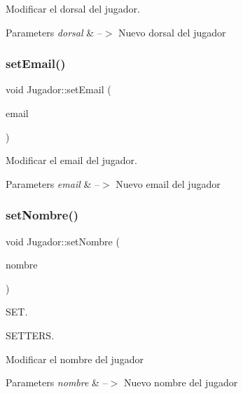 Modificar el dorsal del jugador. 


\begin{DoxyParams}{Parameters}
{\em dorsal} & --$>$ Nuevo dorsal del jugador \\
\hline
\end{DoxyParams}
\mbox{\label{classJugador_abe37872318ab13c0b6043302eb31082c}} 
\subsubsection{\texorpdfstring{set\+Email()}{setEmail()}}
{\footnotesize\ttfamily void Jugador\+::set\+Email (\begin{DoxyParamCaption}\item[{Q\+String}]{email }\end{DoxyParamCaption})}



Modificar el email del jugador. 


\begin{DoxyParams}{Parameters}
{\em email} & --$>$ Nuevo email del jugador \\
\hline
\end{DoxyParams}
\mbox{\label{classJugador_a66ae18a593fe618962a7c78fa201712a}} 
\subsubsection{\texorpdfstring{set\+Nombre()}{setNombre()}}
{\footnotesize\ttfamily void Jugador\+::set\+Nombre (\begin{DoxyParamCaption}\item[{Q\+String}]{nombre }\end{DoxyParamCaption})}



S\+ET. 

S\+E\+T\+T\+E\+RS.

Modificar el nombre del jugador 
\begin{DoxyParams}{Parameters}
{\em nombre} & --$>$ Nuevo nombre del jugador \\
\hline
\end{DoxyParams}
\mbox{\label{classJugador_a0b56f6473a446c7dd2c649dfc2d7cdea}} 
